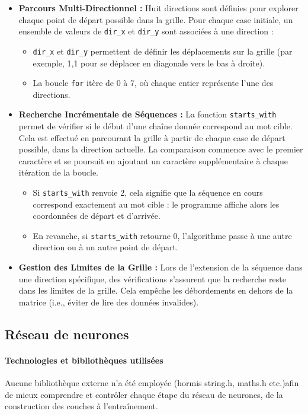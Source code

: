 \begin{itemize}
    \item \textbf{Parcours Multi-Directionnel :} Huit directions sont définies pour explorer chaque point de départ possible dans la grille. Pour chaque case initiale, un ensemble de valeurs de \texttt{dir\_x} et \texttt{dir\_y} sont associées à une direction :
    \begin{itemize}
        \item \texttt{dir\_x} et \texttt{dir\_y} permettent de définir les déplacements sur la grille (par exemple, 1,1 pour se déplacer en diagonale vers le bas à droite).
        \item La boucle \texttt{for} itère de 0 à 7, où chaque entier représente l’une des directions.
    \end{itemize}

    \item \textbf{Recherche Incrémentale de Séquences :} La fonction \texttt{starts\_with} permet de vérifier si le début d’une chaîne donnée correspond au mot cible. Cela est effectué en parcourant la grille à partir de chaque case de départ possible, dans la direction actuelle. La comparaison commence avec le premier caractère et se poursuit en ajoutant un caractère supplémentaire à chaque itération de la boucle.
    \begin{itemize}
        \item Si \texttt{starts\_with} renvoie 2, cela signifie que la séquence en cours correspond exactement au mot cible : le programme affiche alors les coordonnées de départ et d'arrivée.
        \item En revanche, si \texttt{starts\_with} retourne 0, l'algorithme passe à une autre direction ou à un autre point de départ.
    \end{itemize}

    \item \textbf{Gestion des Limites de la Grille :} Lors de l’extension de la séquence dans une direction spécifique, des vérifications s'assurent que la recherche reste dans les limites de la grille. Cela empêche les débordements en dehors de la matrice (i.e., éviter de lire des données invalides).
\end{itemize}


\subsection{Réseau de neurones}

\paragraph{Technologies et bibliothèques utilisées}
Aucune bibliothèque externe n’a été employée (hormis string.h, maths.h etc.)afin de mieux comprendre et contrôler chaque étape du réseau de neurones, de la construction des couches à l'entraînement.

